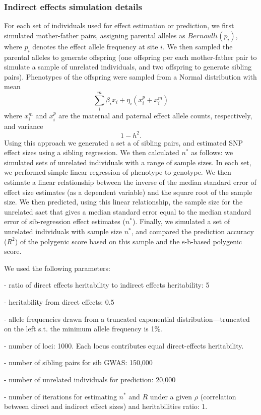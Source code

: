 \documentclass[hidelinks, 12pt]{article}
\begin{document}
\subsubsection{Indirect effects simulation details}
\label{indirect_sim_details}
For each set of individuals used for effect estimation or prediction, we first simulated mother-father pairs, assigning parental alleles as $Bernoulli(p_i)$, where $p_i$ denotes the effect allele frequency at site $i$.  We then sampled the parental alleles to generate offspring (one offspring per each mother-father pair to simulate a sample of unrelated individuals, and two offspring to generate sibling pairs). Phenotypes of the offspring were sampled from a Normal distribution with mean
$$\sum_i^m\beta_ix_i+\eta_i({x}_i^p+{x}_i^m)$$ where ${x}_i^m$ and ${x}_i^p$ are the maternal and paternal effect allele counts, respectively, and variance 
$$1-h^2.$$
Using this approach we generated a set a of sibling pairs, and estimated SNP effect sizes using a sibling regression. We then calculated $n^*$ as follows: we simulated sets of unrelated individuals with a range of sample sizes. In each set, we performed simple linear regression of phenotype to genotype.  We then estimate a linear relationship between the inverse of the median standard error of effect size estimates (as a  dependent variable) and the square root of the sample size.  We then predicted, using this linear relationship, the sample size for the unrelated saet that gives a median standard error equal to the median standard error of sib-regression effect estimates ($n^*$).  Finally, we simulated a set of unrelated individuals with sample size $n^*$, and compared the prediction accuracy ($R^2$) of the polygenic score based on this sample and the s-b-based polygenic score. 

We used the following parameters:

- ratio of direct effects heritability to indirect effects heritability: 5

- heritability from direct effects: 0.5

- allele frequencies drawn from a truncated exponential distribution---truncated on the left s.t. the minimum allele frequency is 1\%.

- number of loci: 1000.  Each locus contributes equal direct-effects heritability.

- number of sibling pairs for sib GWAS: 150,000

- number of unrelated individuals for prediction: 20,000

- number of iterations for estimating $n^*$ and $R$ under a given $\rho$ (correlation between direct and indirect effect sizes) and heritabilities ratio: 1.
\end{document}
